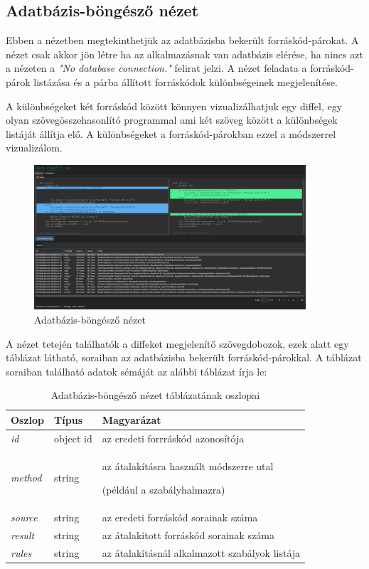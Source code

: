 \subsection{Adatbázis-böngésző nézet}

Ebben a nézetben megtekinthetjük az adatbázisba bekerült forráskód-párokat.
A nézet csak akkor jön létre ha az alkalmazásnak van adatbázis elérése,
ha nincs azt a nézeten a \emph{"No database connection."} felirat jelzi.
A nézet feladata a forráskód-párok listázása és a párba állított forráskódok
különbségeinek megjelenítése.

A különbségeket két forráskód között könnyen vizualizálhatjuk egy diffel,
egy olyan szövegösszehasonlító programmal ami két szöveg között a különbségek
listáját állítja elő.
A különbségeket a forráskód-párokban ezzel a módszerrel vizualizálom.

\begin{figure}[H]
	\centering
	\includegraphics[width=0.9\textwidth]{images/screenshots/database_tab.png}
	\caption{Adatbázis-böngésző nézet}
\end{figure}

A nézet tetején találhatók a diffeket megjelenítő szövegdobozok, ezek alatt
egy táblázat látható, soraiban az adatbázisba bekerült forráskód-párokkal.
A táblázat soraiban található adatok sémáját az alábbi táblázat írja le:

\begin{table}[H]
	\centering
	\begin{tabular}{ | m{} | m{} | m{} | }
		\hline
		\textbf{Oszlop} & \textbf{Típus} & \textbf{Magyarázat} \\
		\hline \hline
		\emph{id} & object id & az eredeti forrráskód azonosítója \\
		\hline
		\emph{method} & string &
		az átalakításra használt módszerre utal 
		
		(például a szabályhalmazra) \\
		\hline
		\emph{source} & string & az eredeti forráskód sorainak száma \\
		\hline
		\emph{result} & string & az átalakított forráskód sorainak száma \\
		\hline
		\emph{rules} & string & az átalakításnál alkalmazott szabályok listája \\
		\hline
	\end{tabular}
	\caption{Adatbázis-böngésző nézet táblázatának oszlopai}
	\label{tab:example-1}
\end{table}

